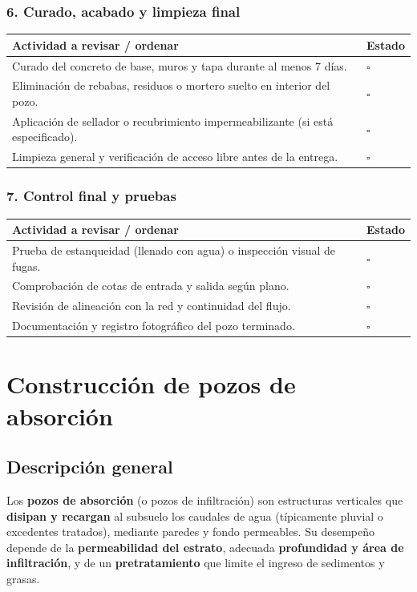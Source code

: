 \documentclass[12pt]{article}
\newcommand{\cbox}{\(\square\)}
\renewcommand{\cbox}{\(\square\)} %
\begin{document}
	\subsubsection*{6. Curado, acabado y limpieza final}
	\begin{tabularx}{\linewidth}{>{\raggedright\arraybackslash}p{0.93\linewidth} >{\centering\arraybackslash}m{0.07\linewidth}}
		\toprule
		\textbf{Actividad a revisar / ordenar} & \textbf{Estado}\\
		\midrule
		Curado del concreto de base, muros y tapa durante al menos 7 días. & \cbox \\
		Eliminación de rebabas, residuos o mortero suelto en interior del pozo. & \cbox \\
		Aplicación de sellador o recubrimiento impermeabilizante (si está especificado). & \cbox \\
		Limpieza general y verificación de acceso libre antes de la entrega. & \cbox \\
		\bottomrule
	\end{tabularx}
	
	\subsubsection*{7. Control final y pruebas}
	\begin{tabularx}{\linewidth}{>{\raggedright\arraybackslash}p{0.93\linewidth} >{\centering\arraybackslash}m{0.07\linewidth}}
		\toprule
		\textbf{Actividad a revisar / ordenar} & \textbf{Estado}\\
		\midrule
		Prueba de estanqueidad (llenado con agua) o inspección visual de fugas. & \cbox \\
		Comprobación de cotas de entrada y salida según plano. & \cbox \\
		Revisión de alineación con la red y continuidad del flujo. & \cbox \\
		Documentación y registro fotográfico del pozo terminado. & \cbox \\
		\bottomrule
	\end{tabularx}
	
	
	
	
	\section{Construcción de pozos de absorción}
	
	\subsection*{Descripción general}
	Los \textbf{pozos de absorción} (o pozos de infiltración) son estructuras verticales que \textbf{disipan y recargan} al subsuelo los caudales de agua (típicamente pluvial o excedentes tratados), mediante paredes y fondo permeables. Su desempeño depende de la \textbf{permeabilidad del estrato}, adecuada \textbf{profundidad y área de infiltración}, y de un \textbf{pretratamiento} que limite el ingreso de sedimentos y grasas.
	
\end{document}
